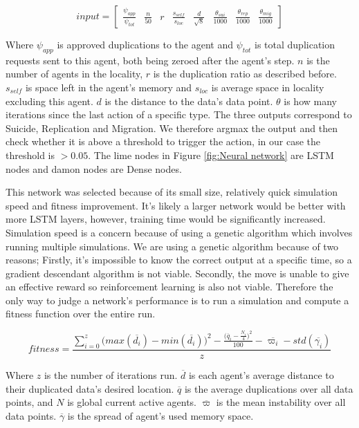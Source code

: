 \documentclass{UoYCSproject}
\begin{document}
\begin{equation}
input = \begin{bmatrix} \frac{\psi_{app}}{\psi_{tot}} & \frac{n}{50} & r & \frac{s_{self}}{s_{loc}} & \frac{d}{\sqrt{8}} & \frac{\theta_{sui}}{1000} & \frac{\theta_{rep}}{1000} & \frac{\theta_{mig}}{1000} \end{bmatrix}
\end{equation}

Where $\psi_{app}$ is approved duplications to the agent and $\psi_{tot}$ is total duplication requests sent to this agent, both being zeroed after the agent's step. 
$n$ is the number of agents in the locality, $r$ is the duplication ratio as described before. 
$s_{self}$ is space left in the agent's memory and $s_{loc}$ is average space in locality excluding this agent. 
$d$ is the distance to the data’s data point. 
$\theta$ is how many iterations since the last action of a specific type. 
The three outputs correspond to Suicide, Replication and Migration. 
We therefore argmax the output and then check whether it is above a threshold to trigger the action, in our case the threshold is $>0.05$. 
The lime nodes in Figure \ref{fig:Neural network} are LSTM nodes and damon nodes are Dense nodes.

This network was selected because of its small size, relatively quick simulation speed and fitness improvement. 
It’s likely a larger network would be better with more LSTM layers, however, training time would be significantly increased. 
Simulation speed is a concern because of using a genetic algorithm which involves running multiple simulations. 
We are using a genetic algorithm because of two reasons;
Firstly, it’s impossible to know the correct output at a specific time, so a gradient descendant algorithm is not viable. 
Secondly, the move is unable to give an effective reward so reinforcement learning is also not viable. 
Therefore the only way to judge a network's performance is to run a simulation and compute a fitness function over the entire run.

\begin{equation}
fitness = \frac{\sum_{i=0}^{z}{\big(max( \overline{d_{i}}) - min( \overline{d_{i}})\big)^{2} - \frac{\big( \overline{q}_{i} - \frac{N_{i}}{4} \big)^{2}}{100} } - \overline{ \varpi_{i} } - std( \overline{\gamma_{i}} )}{z}
\end{equation}

Where $z$ is the number of iterations run. 
$\overline{d}$ is each agent’s average distance to their duplicated data’s desired location.
$\overline{q}$ is the average duplications over all data points, and $N$ is global current active agents. 
$\overline{ \varpi }$ is the mean instability over all data points. 
$\overline{\gamma}$ is the spread of agent's used memory space.
\end{document}
